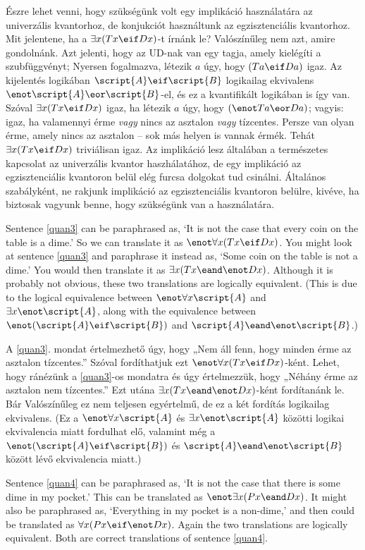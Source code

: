 Észre lehet venni, hogy szükségünk volt egy implikáció használatára az univerzális kvantorhoz, de konjukciót használtunk az egzisztenciális kvantorhoz. Mit jelentene, ha a $\exists x(Tx \eif Dx)$-t írnánk le? Valószínűleg nem azt, amire gondolnánk. Azt jelenti, hogy az UD-nak van egy tagja, amely kielégíti a szubfüggvényt; Nyersen fogalmazva, létezik $a$ úgy, hogy $(Ta \eif Da)$ igaz. Az kijelentés logikában $\script{A} \eif \script{B}$ logikailag ekvivalens $\enot\script{A} \eor \script{B}$-el, és ez a kvantifikált logikában is így van. Szóval $\exists x(Tx \eif Dx)$ igaz, ha létezik $a$ úgy, hogy $(\enot Ta \eor Da)$; vagyis: igaz, ha valamennyi érme \emph{vagy} nincs az asztalon \emph{vagy} tízcentes. Persze van olyan érme, amely nincs az asztalon -- sok más helyen is vannak érmék. Tehát $\exists x(Tx \eif Dx)$ triviálisan igaz. Az implikáció lesz általában a természetes kapcsolat az univerzális kvantor haszhálatához, de egy implikáció az egzisztenciális kvantoron belül elég furcsa dolgokat tud csinálni. Általános szabályként, ne rakjunk implikáció az egzisztenciális kvantoron belülre, kivéve, ha biztosak vagyunk benne, hogy szükségünk van a használatára.

Sentence \ref{quan3} can be paraphrased as, `It is not the case that every coin on the table is a dime.' So we can translate it as $\enot \forall x(Tx \eif Dx)$. You might look at sentence \ref{quan3} and paraphrase it instead as, `Some coin on the table is not a dime.' You would then translate it as $\exists x(Tx \eand \enot Dx)$. Although it is probably not obvious, these two translations are logically equivalent. (This is due to the logical equivalence between $\enot\forall x\script{A}$ and $\exists x\enot\script{A}$, along with the equivalence between $\enot(\script{A}\eif\script{B})$ and $\script{A}\eand\enot\script{B}$.)

A \ref{quan3}. mondat értelmezhető úgy, hogy „Nem áll fenn, hogy minden érme az asztalon tízcentes.” Szóval fordíthatjuk ezt $\enot \forall x(Tx \eif Dx)$-ként. Lehet, hogy ránézünk a \ref{quan3}-os mondatra és úgy értelmezzük, hogy „Néhány érme az asztalon nem tízcentes.” Ezt utána $\exists x(Tx \eand \enot Dx)$-ként fordítanánk le. Bár Valószínűleg ez nem teljesen egyértelmű, de ez a két fordítás logikailag ekvivalens. (Ez a $\enot\forall x\script{A}$ és $\exists x\enot\script{A}$ közötti logikai ekvivalencia miatt fordulhat elő, valamint még a $\enot(\script{A}\eif\script{B})$ és $\script{A}\eand\enot\script{B}$ között lévő ekvivalencia miatt.)

Sentence \ref{quan4} can be paraphrased as, `It is not the case that there is some dime in my pocket.' This can be translated as $\enot\exists x(Px \eand Dx)$. It might also be paraphrased as, `Everything in my pocket is a non-dime,' and then could be translated as $\forall x(Px \eif \enot Dx)$. Again the two translations are logically equivalent. Both are correct translations of sentence \ref{quan4}.

